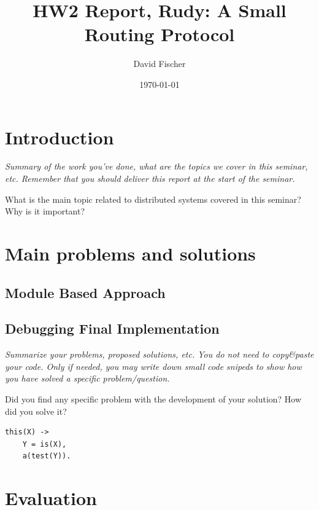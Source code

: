 \documentclass[a4paper, 11pt]{article}
\title{HW2 Report, Rudy: A Small Routing Protocol}
\author{David Fischer}
\date{\today{}}
\begin{document}
\maketitle

\section{Introduction}

\textit{Summary of the work you've done, what are the topics we cover
  in this seminar, etc. Remember that you should deliver this report
  at the start of the seminar.}

What is the main topic related to distributed systems covered in this seminar?
Why is it important?

\section{Main problems and solutions}

\subsection{Module Based Approach}

\subsection{Debugging Final Implementation}

\textit{Summarize your problems, proposed solutions, etc. You do not
  need to copy\&paste your code. Only if needed, you may write down
  small code snipeds to show how you have solved a specific
  problem/question.}

Did you find any specific problem with the development of your
solution?  How did you solve it?

\begin{verbatim}
this(X) ->
    Y = is(X),
    a(test(Y)).
\end{verbatim}

\section{Evaluation}

\end{document}
